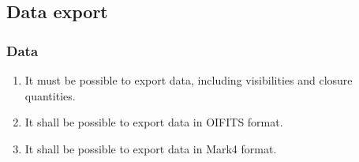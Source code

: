 \documentclass[11pt,a4paper]{article}
\begin{document}
\subsection{Data export}

\subsubsection{Data}

\begin{enumerate}[subsubseclist]
  \item It must be possible to export data, including visibilities and
    closure quantities.

  \item It shall be possible to export data in OIFITS format.

  \item It shall be possible to export data in Mark4 format.
    
\end{enumerate}
\end{document}

